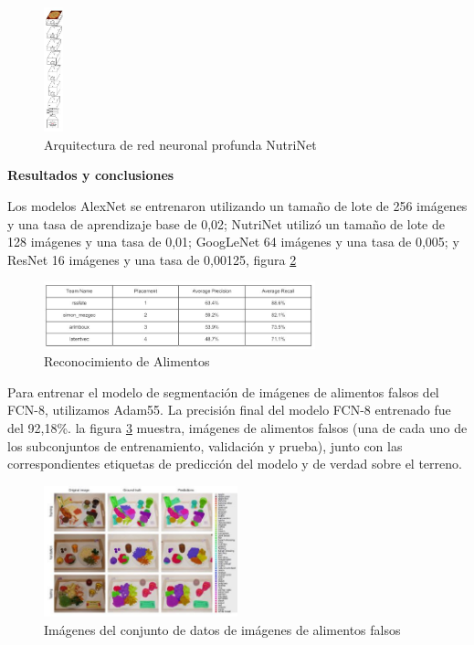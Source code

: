 \begin{figure}[h]
		\begin{center}
			\includegraphics[width=0.05\textwidth]{2/imagen2/20FIGURA20PAPER4.JPG}
	        \caption{ Arquitectura de red neuronal profunda NutriNet}
			\label{fig18}
		\end{center}
		
	\end{figure}
 
\textbf{Resultados y conclusiones}

\thinspace
Los modelos AlexNet se entrenaron utilizando un tamaño de lote de 256 imágenes y una tasa de aprendizaje base de 0,02; NutriNet utilizó un tamaño de lote de 128 imágenes y una tasa de 0,01; GoogLeNet 64 imágenes y una tasa de 0,005; y ResNet 16 imágenes y una tasa de 0,00125, figura \ref{fig19}

\begin{figure}[h]
		\begin{center}
			\includegraphics[width=0.7\textwidth]{2/imagen2/21FIGURA21PAPER4.JPG}
	        \caption{Reconocimiento de Alimentos}
			\label{fig19}
		\end{center}
		
	\end{figure}

Para entrenar el modelo de segmentación de imágenes de alimentos falsos del FCN-8, utilizamos Adam55. La precisión final del modelo FCN-8 entrenado fue del 92,18\%. la figura \ref{fig20} muestra, imágenes de alimentos falsos (una de cada uno de los subconjuntos de entrenamiento, validación y prueba), junto con las correspondientes etiquetas de predicción del modelo y de verdad sobre el terreno.

\begin{figure}[h]
		\begin{center}
			\includegraphics[width=0.5\textwidth]{2/imagen2/22FIGURA22PAPER4.JPG}
	        \caption{ Imágenes del conjunto de datos de imágenes de alimentos falsos}
			\label{fig20}
		\end{center}
		
	\end{figure}

